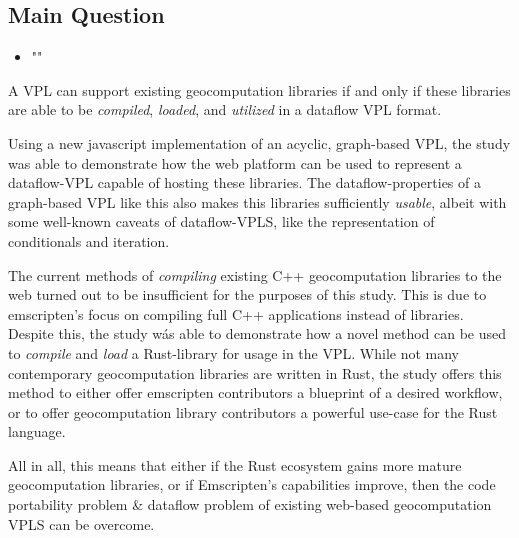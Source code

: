 \subsection*{Main Question}

\begin{itemize}[ ]
    \item "\myMainRQ"
\end{itemize}


A VPL can support existing geocomputation libraries if and only if these libraries are able to be \emph{compiled}, \emph{loaded}, and \emph{utilized} in a dataflow VPL format.

Using a new javascript implementation of an acyclic, graph-based VPL, the study was able to demonstrate how the web platform can be used to represent a dataflow-VPL capable of hosting these libraries.
The dataflow-properties of a graph-based VPL like this also makes this libraries sufficiently \emph{usable}, albeit with some well-known caveats of dataflow-VPLS, like the representation of conditionals and iteration. 

The current methods of \emph{compiling} existing C++ geocomputation libraries to the web turned out to be insufficient for the purposes of this study.  
This is due to emscripten's focus on compiling full C++ applications instead of libraries.
Despite this, the study wás able to demonstrate how a novel method can be used to  \emph{compile} and \emph{load} a Rust-library for usage in the VPL.
While not many contemporary geocomputation libraries are written in Rust, the study offers this method to either offer emscripten contributors a blueprint of a desired workflow, or to offer geocomputation library contributors a powerful use-case for the Rust language. 

All in all, this means that either if the Rust ecosystem gains more mature geocomputation libraries, or if Emscripten's capabilities improve, then the code portability problem \& dataflow problem of existing web-based geocomputation VPLS can be overcome. 




